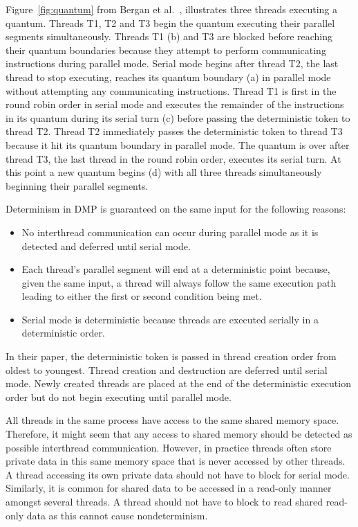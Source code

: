 Figure~\ref{fig:quantum} from Bergan et al.~\cite{coredet},
illustrates three threads executing a quantum.  Threads T1, T2 and T3
begin the quantum executing their parallel segments simultaneously.
Threads T1 (b) and T3 are blocked before reaching their quantum
boundaries because they attempt to perform communicating instructions
during parallel mode.  Serial mode begins after thread T2, the last
thread to stop executing, reaches its quantum boundary (a) in parallel
mode without attempting any communicating instructions.  Thread T1 is
first in the round robin order in serial mode and executes the
remainder of the instructions in its quantum during its serial turn
(c) before passing the deterministic token to thread T2.  Thread T2
immediately passes the deterministic token to thread T3 because it hit
its quantum boundary in parallel mode.  The quantum is over after
thread T3, the last thread in the round robin order, executes its
serial turn.  At this point a new quantum begins (d) with all three
threads simultaneously beginning their parallel segments.

Determinism in DMP is guaranteed on the same input for the following
reasons:

\begin{itemize}
\item No interthread communication can occur during parallel mode as
  it is detected and deferred until serial mode.

\item Each thread's parallel segment will end at a deterministic point
  because, given the same input, a thread will always follow the same
  execution path leading to either the first or second condition being
  met.

\item Serial mode is deterministic because threads are executed
  serially in a deterministic order.
\end{itemize}

In their paper, the deterministic token is passed in thread creation
order from oldest to youngest.  Thread creation and destruction are
deferred until serial mode.  Newly created threads are placed at the
end of the deterministic execution order but do not begin executing
until parallel mode.

All threads in the same process have access to the same shared memory
space.  Therefore, it might seem that any access to shared memory
should be detected as possible interthread communication.  However, in
practice threads often store private data in this same memory space
that is never accessed by other threads.  A thread accessing its own
private data should not have to block for serial mode.  Similarly, it
is common for shared data to be accessed in a read-only manner amongst
several threads.  A thread should not have to block to read shared
read-only data as this cannot cause nondeterminism.

